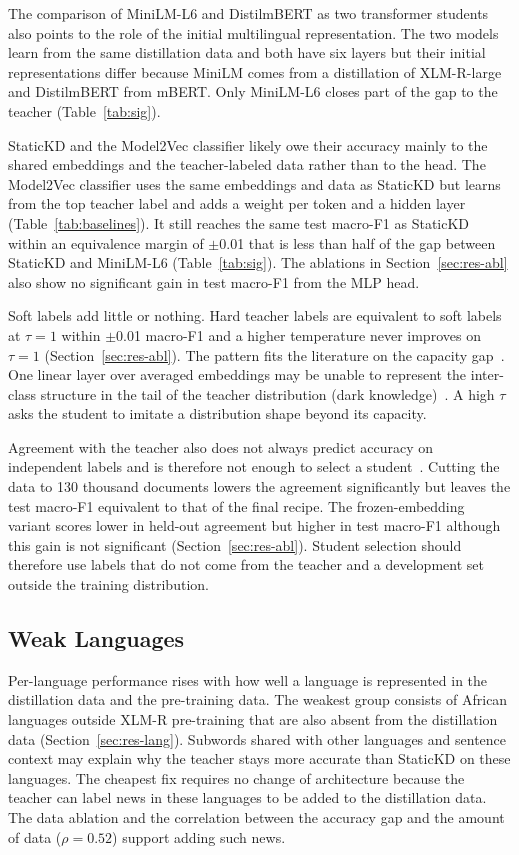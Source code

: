 \documentclass{ieeeaccess}
\begin{document}
The comparison of MiniLM-L6 and DistilmBERT as two transformer students also points to the role of the initial multilingual representation. The two models learn from the same distillation data and both have six layers but their initial representations differ because MiniLM comes from a distillation of XLM-R-large and DistilmBERT from mBERT. Only MiniLM-L6 closes part of the gap to the teacher (Table~\ref{tab:sig}).

StaticKD and the Model2Vec classifier likely owe their accuracy mainly to the shared embeddings and the teacher-labeled data rather than to the head. The Model2Vec classifier uses the same embeddings and data as StaticKD but learns from the top teacher label and adds a weight per token and a hidden layer (Table~\ref{tab:baselines}). It still reaches the same test macro-F1 as StaticKD within an equivalence margin of $\pm$0.01 that is less than half of the gap between StaticKD and MiniLM-L6 (Table~\ref{tab:sig}). The ablations in Section~\ref{sec:res-abl} also show no significant gain in test macro-F1 from the MLP head.

Soft labels add little or nothing. Hard teacher labels are equivalent to soft labels at $\tau=1$ within $\pm$0.01 macro-F1 and a higher temperature never improves on $\tau=1$ (Section~\ref{sec:res-abl}). The pattern fits the literature on the capacity gap~\cite{zhang2025law,wang2026rckd}. One linear layer over averaged embeddings may be unable to represent the inter-class structure in the tail of the teacher distribution (dark knowledge)~\cite{zhao2022dkd}. A high $\tau$ asks the student to imitate a distribution shape beyond its capacity.

Agreement with the teacher also does not always predict accuracy on independent labels and is therefore not enough to select a student~\cite{stanton2021kd}. Cutting the data to 130 thousand documents lowers the agreement significantly but leaves the test macro-F1 equivalent to that of the final recipe. The frozen-embedding variant scores lower in held-out agreement but higher in test macro-F1 although this gain is not significant (Section~\ref{sec:res-abl}). Student selection should therefore use labels that do not come from the teacher and a development set outside the training distribution.

\subsection{Weak Languages}
Per-language performance rises with how well a language is represented in the distillation data and the pre-training data. The weakest group consists of African languages outside XLM-R pre-training that are also absent from the distillation data (Section~\ref{sec:res-lang}). Subwords shared with other languages and sentence context may explain why the teacher stays more accurate than StaticKD on these languages. The cheapest fix requires no change of architecture because the teacher can label news in these languages to be added to the distillation data. The data ablation and the correlation between the accuracy gap and the amount of data ($\rho=0.52$) support adding such news.
\end{document}
